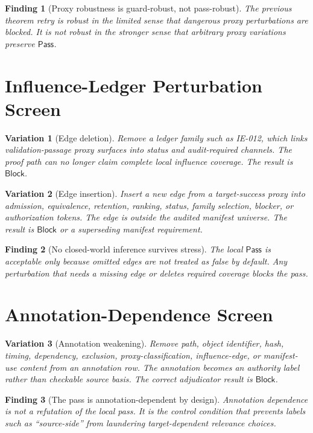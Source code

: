 \documentclass[11pt]{article}
\newcommand{\Pass}{\mathsf{Pass}}
\newcommand{\Block}{\mathsf{Block}}
\newtheorem{finding}{Finding}
\newtheorem{variant}{Variation}
\begin{document}
\begin{finding}[Proxy robustness is guard-robust, not pass-robust]
The previous theorem retry is robust in the limited sense that dangerous
proxy perturbations are blocked. It is not robust in the stronger sense
that arbitrary proxy variations preserve \(\Pass\).
\end{finding}

\section{Influence-Ledger Perturbation Screen}

\begin{variant}[Edge deletion]
Remove a ledger family such as IE-012, which links validation-passage proxy
surfaces into status and audit-required channels. The proof path can no
longer claim complete local influence coverage. The result is
\(\Block\).
\end{variant}

\begin{variant}[Edge insertion]
Insert a new edge from a target-success proxy into admission, equivalence,
retention, ranking, status, family selection, blocker, or authorization
tokens. The edge is outside the audited manifest universe. The result is
\(\Block\) or a superseding manifest requirement.
\end{variant}

\begin{finding}[No closed-world inference survives stress]
The local \(\Pass\) is acceptable only because omitted edges are not
treated as false by default. Any perturbation that needs a missing edge or
deletes required coverage blocks the pass.
\end{finding}

\section{Annotation-Dependence Screen}

\begin{variant}[Annotation weakening]
Remove path, object identifier, hash, timing, dependency, exclusion,
proxy-classification, influence-edge, or manifest-use content from an
annotation row. The annotation becomes an authority label rather than
checkable source basis. The correct adjudicator result is \(\Block\).
\end{variant}

\begin{finding}[The pass is annotation-dependent by design]
Annotation dependence is not a refutation of the local pass. It is the
control condition that prevents labels such as ``source-side'' from
laundering target-dependent relevance choices.
\end{finding}
\end{document}

